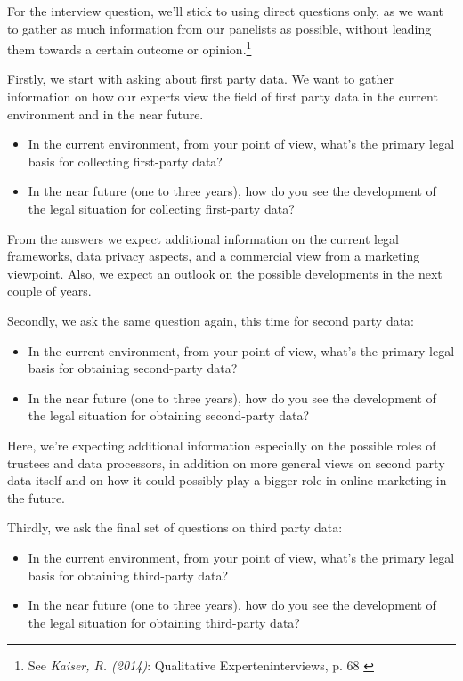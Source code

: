 For the interview question, we'll stick to using direct questions only, as we want to gather as much information from our panelists as possible, without leading them towards a certain outcome or opinion.\footnote{See \textit{Kaiser, R. (2014)}: Qualitative Experteninterviews, p. 68 \cite{expertInterviews}} 

Firstly, we start with asking about first party data. We want to gather information on how our experts view the field of first party data in the current environment and in the near future. 

\begin{itemize}
 \item In the current environment, from your point of view, what's the primary legal basis for collecting first-party data?
 \item In the near future (one to three years), how do you see the development of the legal situation for collecting first-party data?
\end{itemize}
 
From the answers we expect additional information on the current legal frameworks, data privacy aspects, and a commercial view from a marketing viewpoint. Also, we expect an outlook on the possible developments in the next couple of years.
 
Secondly, we ask the same question again, this time for second party data:

\begin{itemize} 
 \item In the current environment, from your point of view, what's the primary legal basis for obtaining second-party data?
 \item In the near future (one to three years), how do you see the development of the legal situation for obtaining second-party data?
\end{itemize}

Here, we're expecting additional information especially on the possible roles of trustees and data processors, in addition on more general views on second party data itself and on how it could possibly play a bigger role in online marketing in the future.
 
Thirdly, we ask the final set of questions on third party data:

\begin{itemize} 
 \item In the current environment, from your point of view, what's the primary legal basis for obtaining third-party data?
 \item In the near future (one to three years), how do you see the development of the legal situation for obtaining third-party data?
\end{itemize} 
 

